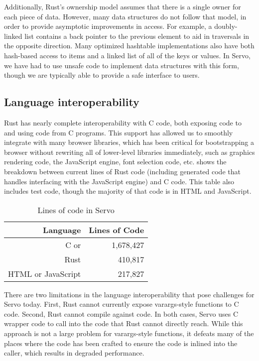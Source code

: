 Additionally, Rust's ownership model assumes that there is a single owner for each piece of data.
However, many data structures do not follow that model, in order to provide asymptotic
improvements in access.
For example, a doubly-linked list contains a back pointer to the previous element to aid
in traversals in the opposite direction.
Many optimized hashtable implementations also have both hash-based access to items
and a linked list of all of the keys or values.
In Servo, we have had to use unsafe code to implement data structures with this form,
though we are typically able to provide a safe interface to users.

\subsection{Language interoperability}
Rust has nearly complete interoperability with C code, both exposing code to and using code from
C programs.
This support has allowed us to smoothly integrate with many browser libraries, which has been
critical for bootstrapping a browser without rewriting all of lower-level libraries immediately, such as
graphics rendering code, the JavaScript engine, font selection code, etc.
 shows the breakdown between current lines of Rust code (including generated code that
handles interfacing with the JavaScript engine) and C code.
This table also includes test code, though the majority of that code is in HTML and JavaScript.
\begin{table}
  \begin{center}
    \begin{tabular}{r || r}
      Language & Lines of Code \\
      \hline
      C or \Cplusplus{} & 1,678,427 \\
      Rust & 410,817 \\
      HTML or JavaScript & 217,827 \\
    \end{tabular}%
  \end{center}%
  \caption{Lines of code in Servo}
  \label{servo-loc}
\end{table}

There are two limitations in the language interoperability that pose challenges for Servo today.
First, Rust cannot currently expose varargs-style functions to C code.
Second, Rust cannot compile against \Cplusplus{} code.
In both cases, Servo uses C wrapper code to call into the code that Rust cannot directly
reach.
While this approach is not a large problem for varargs-style functions, it defeats many of the
places where the \Cplusplus{} code has been crafted to ensure the code is inlined into the caller,
which results in degraded performance.

